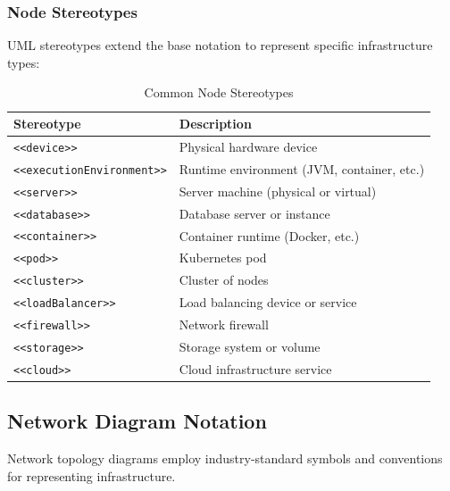 \documentclass[11pt,letterpaper]{article}
\begin{document}
\subsubsection{Node Stereotypes}

UML stereotypes extend the base notation to represent specific infrastructure types:

\begin{table}[H]
\centering
\caption{Common Node Stereotypes}
\small
\begin{tabular}{@{}L{3.5cm}L{10cm}@{}}
\toprule
\textbf{Stereotype} & \textbf{Description} \\
\midrule
\texttt{<<device>>} & Physical hardware device \\
\texttt{<<execution}\allowbreak{}\texttt{Environment>>} & Runtime environment (JVM, container, etc.) \\
\texttt{<<server>>} & Server machine (physical or virtual) \\
\texttt{<<database>>} & Database server or instance \\
\texttt{<<container>>} & Container runtime (Docker, etc.) \\
\texttt{<<pod>>} & Kubernetes pod \\
\texttt{<<cluster>>} & Cluster of nodes \\
\texttt{<<loadBalancer>>} & Load balancing device or service \\
\texttt{<<firewall>>} & Network firewall \\
\texttt{<<storage>>} & Storage system or volume \\
\texttt{<<cloud>>} & Cloud infrastructure service \\
\bottomrule
\end{tabular}
\end{table}

\subsection{Network Diagram Notation}

Network topology diagrams employ industry-standard symbols and conventions for representing infrastructure.
\end{document}
